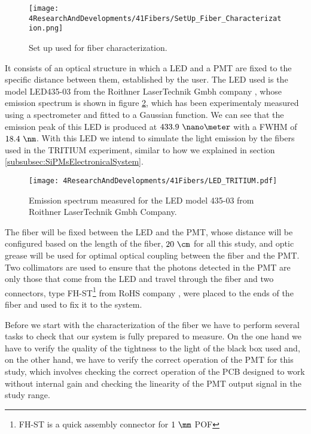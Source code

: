 \begin{figure}[h]
\centering
\texttt{[image: 4ResearchAndDevelopments/41Fibers/SetUp\_Fiber\_Characterization.png]}
\caption{Set up used for fiber characterization.\label{fig:SetUpFiberCharacterization}}
\end{figure}

It consists of an optical structure in which a LED and a PMT are fixed to the specific distance between them, established by the user. The LED used is the model LED435-03 from the Roithner LaserTechnik Gmbh company \cite{LEDRLT}, whose emission spectrum is shown in figure \ref{fig:LEDSpectrumTritium}, which has been experimentaly measured using a spectrometer and fitted to a Gaussian function. We can see that the emission peak of this LED is produced at $433.9~\nano\meter$ with a FWHM of $18.4~\nm$. With this LED we intend to simulate the light emission by the fibers used in the TRITIUM experiment, similar to how we explained in section \ref{subsubsec:SiPMsElectronicalSystem}.

\begin{figure}[h]
\centering
\texttt{[image: 4ResearchAndDevelopments/41Fibers/LED\_TRITIUM.pdf]}
\caption{Emission spectrum measured for the LED model 435-03 from Roithner LaserTechnik Gmbh Company.\label{fig:LEDSpectrumTritium}}
\end{figure}

The fiber will be fixed between the LED and the PMT, whose distance will be configured based on the length of the fiber, $20~\cm$ for all this study, and optic grease \cite{OpticalGrease} will be used for optimal optical coupling between the fiber and the PMT. Two collimators are used to ensure that the photons detected in the PMT are only those that come from the LED and travel through the fiber and two connectors, type FH-ST\footnote{FH-ST is a quick assembly connector for $1~\mm$ POF} from RoHS company \cite{}, were placed to the ends of the fiber and used to fix it to the system. 

Before we start with the characterization of the fiber we have to perform several tasks to check that our system is fully prepared to measure. On the one hand we have to verify the quality of the tightness to the light of the black box used and, on the other hand, we have to verify the correct operation of the PMT for this study, which involves checking the correct operation of the PCB designed to work without internal gain and checking the linearity of the PMT output signal in the study range.

